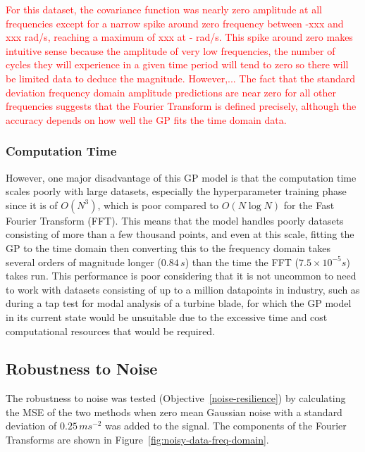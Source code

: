 \documentclass[12pt]{article}
\begin{document}
    \textcolor{red}{For this dataset, the covariance function was nearly zero amplitude at all frequencies except for a narrow spike around zero frequency between -xxx and xxx rad/s, reaching a maximum of xxx at - rad/s.
    This spike around zero makes intuitive sense because the amplitude of very low frequencies, the number of cycles they will experience in a given time period will tend to zero so there will be limited data to deduce the magnitude.
    However,...
    The fact that the standard deviation frequency domain amplitude predictions are near zero for all other frequencies suggests that the Fourier Transform is defined precisely, although the accuracy depends on how well the GP fits the time domain data.}

    \subsubsection{Computation Time}
    However, one major disadvantage of this GP model is that the computation time scales poorly with large datasets, especially the hyperparameter training phase since it is of $O(N^3)$, which is poor compared to $O(N \log{N})$ for the Fast Fourier Transform (FFT).
    This means that the model handles poorly datasets consisting of more than a few thousand points, and even at this scale, fitting the GP to the time domain then converting this to the frequency domain takes several orders of magnitude longer ($0.84 \, s$) than the time the FFT ($7.5 \times 10^{-5}s$) takes run.
    This performance is poor considering that it is not uncommon to need to work with datasets consisting of up to a million datapoints in industry, such as during a tap test for modal analysis of a turbine blade, for which the GP model in its current state would be unsuitable due to the excessive time and cost computational resources that would be required.

    \subsection{Robustness to Noise}
    The robustness to noise was tested (Objective~\ref{noise-resilience}) by calculating the MSE of the two methods when zero mean Gaussian noise with a standard deviation of $0.25 \, ms^{-2}$ was added to the signal.
    The components of the Fourier Transforms are shown in Figure~\ref{fig:noisy-data-freq-domain}.
\end{document}
